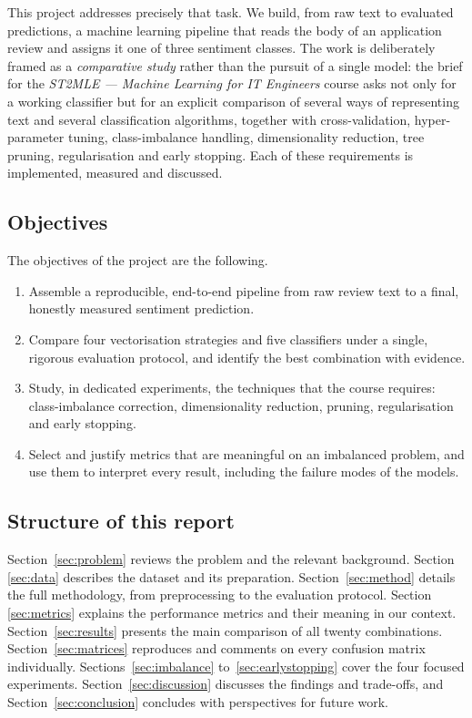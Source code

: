 \documentclass[11pt,a4paper]{article}
\begin{document}
This project addresses precisely that task. We build, from raw text to evaluated
predictions, a machine learning pipeline that reads the body of an application review
and assigns it one of three sentiment classes. The work is deliberately framed as a
\emph{comparative study} rather than the pursuit of a single model: the brief for the
\emph{ST2MLE --- Machine Learning for IT Engineers} course asks not only for a working
classifier but for an explicit comparison of several ways of representing text and
several classification algorithms, together with cross-validation, hyper-parameter
tuning, class-imbalance handling, dimensionality reduction, tree pruning, regularisation
and early stopping. Each of these requirements is implemented, measured and discussed.

\subsection{Objectives}
The objectives of the project are the following.
\begin{enumerate}[leftmargin=1.6em,itemsep=1pt]
\item Assemble a reproducible, end-to-end pipeline from raw review text to a final,
honestly measured sentiment prediction.
\item Compare four vectorisation strategies and five classifiers under a single,
rigorous evaluation protocol, and identify the best combination with evidence.
\item Study, in dedicated experiments, the techniques that the course requires:
class-imbalance correction, dimensionality reduction, pruning, regularisation and
early stopping.
\item Select and justify metrics that are meaningful on an imbalanced problem, and use
them to interpret every result, including the failure modes of the models.
\end{enumerate}

\subsection{Structure of this report}
Section~\ref{sec:problem} reviews the problem and the relevant background. Section~%
\ref{sec:data} describes the dataset and its preparation. Section~\ref{sec:method}
details the full methodology, from preprocessing to the evaluation protocol. Section~%
\ref{sec:metrics} explains the performance metrics and their meaning in our context.
Section~\ref{sec:results} presents the main comparison of all twenty combinations.
Section~\ref{sec:matrices} reproduces and comments on every confusion matrix
individually. Sections~\ref{sec:imbalance} to~\ref{sec:earlystopping} cover the four
focused experiments. Section~\ref{sec:discussion} discusses the findings and
trade-offs, and Section~\ref{sec:conclusion} concludes with perspectives for future
work.
\end{document}

